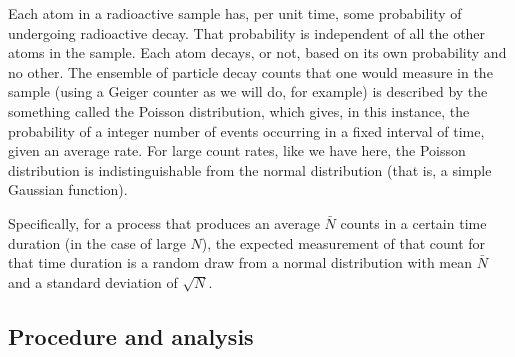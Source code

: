 Each atom in a radioactive sample has, per unit time, some probability of undergoing
radioactive decay. That probability is independent of all the other atoms in the sample.
Each atom decays, or not, based on its own probability and no other. The ensemble of
particle decay counts that one would measure in the sample (using a Geiger counter as we will
do, for example) is described by the something called the Poisson distribution, which
gives, in this instance, the probability of a integer number of events occurring in a fixed
interval of time, given an average rate. For large count rates, like we have here, the
Poisson distribution is indistinguishable from the normal distribution (that is, a simple
Gaussian function).

Specifically, for a process that produces an average $\bar{N}$ counts in a certain time duration (in the case of large $N$), the expected measurement of that count for that time duration is a
random draw from a normal distribution with mean $\bar{N}$ and a standard deviation of
$\sqrt{N}$.

\subsection{Procedure and analysis}

